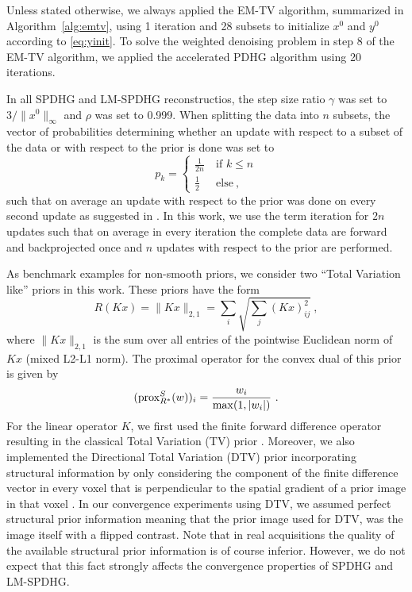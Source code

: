 Unless stated otherwise, we always applied the EM-TV algorithm, summarized in Algorithm~\ref{alg:emtv}, 
using 1 iteration and 28 subsets to initialize $x^0$ and $y^0$ according to \eqref{eq:yinit}.
To solve the weighted denoising problem in step 8 of the EM-TV algorithm, we applied the
accelerated PDHG algorithm \cite{Chambolle2011} using 20 iterations.

In all SPDHG and LM-SPDHG reconstructios, the step size ratio $\gamma$ was set 
to $3 / \|x^0\|_\infty$ and $\rho$ was set to 0.999.
When splitting the data into $n$ subsets, the vector of probabilities determining 
whether an update with respect to a subset of the data or with respect to the prior is 
done was set to 
%
\begin{equation}
p_k = 
  \begin{cases}
  \frac{1}{2n} \ &\text{if } k \leq n \\
  \frac{1}{2}  \ &\text{else} \ ,
  \end{cases}
\end{equation}
%
such that on average an update with respect to the prior was done on every second update
as suggested in \cite{Ehrhardt2019}. 
In this work, we use the term iteration for $2n$ updates such that on average in every iteration
the complete data are forward and backprojected once and $n$ updates with respect to the
prior are performed.

As benchmark examples for non-smooth priors, we consider two ``Total Variation like'' priors
in this work. 
These priors have the form
%
\begin{equation}
  R(Kx) = \|K x\|_{2,1} = \sum_i \sqrt{\sum_j (Kx)_{ij}^2} \ ,
\end{equation}
%
where $\|K x \|_{2,1}$ is the sum over all entries of the pointwise Euclidean norm of $K x$
(mixed L2-L1 norm).
The proximal operator for the convex dual of this prior is given by
%
\begin{equation}
(\operatorname{prox}_{R^*}^S(w) )_i = \frac{w_i}{\max(1,|w_i|)} \ .
\end{equation}
%
For the linear operator $K$, we first used the finite forward difference operator resulting
in the classical Total Variation (TV) prior \cite{Rudin1992}.
Moreover, we also implemented the Directional Total Variation (DTV) prior incorporating
structural information by only considering the component of the finite difference vector in every voxel
that is perpendicular to the spatial gradient of a prior image in that voxel \cite{Ehrhardt2016}.
In our convergence experiments using DTV, we assumed perfect structural prior information
meaning that the prior image used for DTV, was the image itself with a flipped contrast.
Note that in real acquisitions the quality of the available structural prior information is
of course inferior. 
However, we do not expect that this fact strongly affects the convergence properties of 
SPDHG and LM-SPDHG. 

